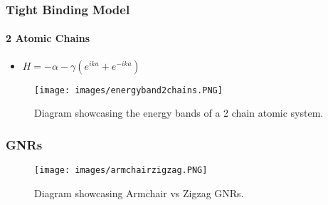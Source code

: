 \documentclass{beamer}
\begin{document}
	\begin{frame}
		\frametitle{Tight Binding Model}
		\framesubtitle{2 Atomic Chains}
		
		\begin{itemize}
			\item $ H = - \alpha -\gamma(e^{ika} + e^{-ika}) $
		\end{itemize}
	
	\begin{figure}[h]
		\begin{center}
			\texttt{[image: images/energyband2chains.PNG]}
		\end{center}
		\caption{Diagram showcasing the energy bands of a 2 chain atomic system.} 
		\label{fig:2chainsenergybands}
	\end{figure}
	\end{frame}
 
	\begin{frame}
		\frametitle{GNRs}
		\begin{figure}[h]
			\begin{center}
				\texttt{[image: images/armchairzigzag.PNG]}
			\end{center}
			\caption{Diagram showcasing Armchair vs Zigzag GNRs.} 
			\label{fig:2chainsenergybands}
		\end{figure}
	\end{frame}


	
\end{document}
